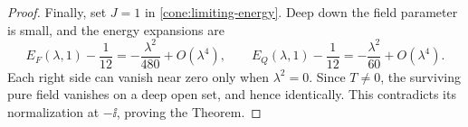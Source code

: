 \begin{proof}
Finally, set \(J=1\) in \eqref{cone:limiting-energy}. Deep down the
field parameter is small, and the energy expansions are
\[
 E_F(\lambda,1)-\frac1{12}
 =-\frac{\lambda^2}{480}+O(\lambda^4),\qquad
 E_Q(\lambda,1)-\frac1{12}
 =-\frac{\lambda^2}{60}+O(\lambda^4).
\]
Each right side can vanish near zero only when \(\lambda^2=0\).
Since \(T\ne0\), the surviving pure field vanishes on a deep open
set, and hence identically. This contradicts its normalization at
\(-\ii\), proving the Theorem.
\end{proof}
